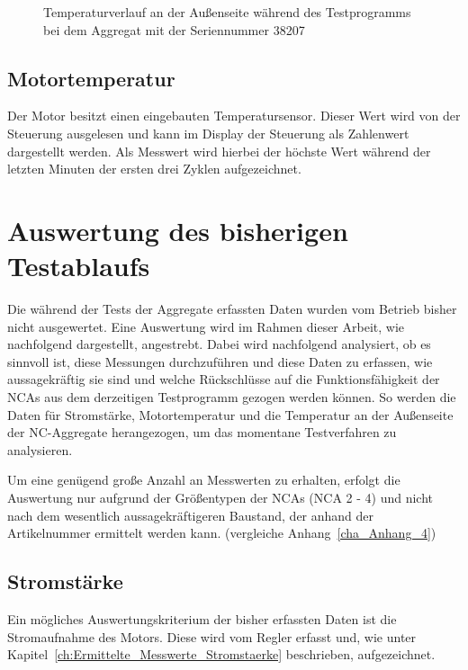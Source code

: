 \begin{figure}[H]

\caption{Temperaturverlauf an der Außenseite während des Testprogramms bei dem Aggregat mit der Seriennummer 38207}
\label{fig:Einlauf_Temperaturanzeige}
\end{figure}


\subsection{Motortemperatur} \label{cha:Einlaufen_Motortemperatur}

Der Motor besitzt einen eingebauten Temperatursensor. Dieser Wert wird von der Steuerung ausgelesen und kann im Display der Steuerung als Zahlenwert dargestellt werden. Als Messwert wird hierbei der höchste Wert während der letzten Minuten der ersten drei Zyklen aufgezeichnet. 

\section{Auswertung des bisherigen Testablaufs}

Die während der Tests der Aggregate erfassten Daten wurden vom Betrieb bisher nicht ausgewertet. Eine Auswertung wird im Rahmen dieser Arbeit, wie nachfolgend dargestellt, angestrebt. Dabei wird nachfolgend analysiert, ob es sinnvoll ist, diese Messungen durchzuführen und diese Daten zu erfassen, wie aussagekräftig sie sind und welche Rückschlüsse auf die Funktionsfähigkeit der NCAs aus dem derzeitigen Testprogramm gezogen werden können. So werden die Daten für Stromstärke, Motortemperatur und die Temperatur an der Außenseite der NC-Aggregate herangezogen, um das momentane Testverfahren zu analysieren.

Um eine genügend große Anzahl an Messwerten zu erhalten, erfolgt die Auswertung nur aufgrund der Größentypen der NCAs (NCA 2 - 4) und nicht nach dem wesentlich aussagekräftigeren Baustand, der anhand der Artikelnummer ermittelt werden kann. (vergleiche Anhang~\ref{cha_Anhang_4})



\subsection{Stromstärke}

Ein mögliches Auswertungskriterium der bisher erfassten Daten ist die Stromaufnahme des Motors. Diese wird vom Regler erfasst und, wie unter Kapitel~\ref{ch:Ermittelte_Messwerte_Stromstaerke} beschrieben, aufgezeichnet.

